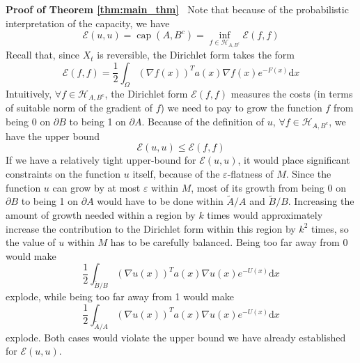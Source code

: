 \documentclass[english, aip, jcp, priprint, graphicx]{revtex4-1}
\newcommand{\mathd}{\mathrm{d}}
\newcommand{\tmop}[1]{\ensuremath{\operatorname{#1}}}
\theoremstyle{plain}
\theoremstyle{definition}
\theoremstyle{plain}
\begin{document}
\noindent\textbf{Proof of Theorem \ref{thm:main_thm}\ }
Note that because of the probabilistic interpretation of the capacity, we have
\[ \mathcal{E} (u, u) = \tmop{cap} (A, B^c) = \inf_{f \in \mathcal{H}_{A, B^c}} \mathcal{E} (f, f) \]
Recall that, since $X_t$ is reversible, the Dirichlet form takes the form
\[ \mathcal{E} (f, f) = \frac{1}{2} \int_{\Omega} (\nabla f (x))^T a
(x) \nabla f (x) e^{- F (x)} \mathd x \]
Intuitively, $\forall f \in \mathcal{H}_{A, B^c}$, the Dirichlet form $\mathcal{E} (f, f)$ measures the costs (in terms of suitable norm of the gradient of $f$) we need to pay to grow the function $f$ from being 0 on $\partial B$ to being 1 on $\partial A$. Because of the definition of $u$, $\forall f \in \mathcal{H}_{A, B^c}$, we have the upper bound \[ \mathcal{E} (u, u) \leqslant \mathcal{E} (f, f) \] If we have a relatively tight upper-bound for $\mathcal{E} (u, u)$, it would place significant constraints on the function $u$ itself, because of the $\varepsilon$-flatness of $M$. Since the function $u$ can grow by at most $\varepsilon$ within $M$, most of its growth from being $0$ on $\partial B$ to being 1 on $\partial A$ would have to be done within $\tilde{A} / A$ and $\tilde{B} / B$. Increasing the amount of growth needed within a region by $k$ times would approximately increase the contribution to the Dirichlet form within this region by $k^2$ times, so the value of $u$ within $M$ has to be carefully balanced. Being too far away from 0 would make
\[ \frac{1}{2} \int_{\tilde{B} / B} (\nabla u (x))^T a (x) \nabla u (x) e^{- U (x)} \mathd x \]
explode, while being too far away from 1 would make
\[ \frac{1}{2} \int_{\tilde{A} / A} (\nabla u (x))^T a (x) \nabla u (x) e^{- U (x)} \mathd x \]
explode. Both cases would violate the upper bound we have already established for $\mathcal{E} (u, u)$.
\end{document}
